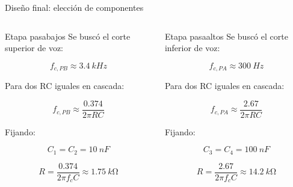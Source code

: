 \documentclass[aspectratio=169,11pt]{beamer}
\begin{document}
\begin{frame}{Diseño final: elección de componentes}
\scriptsize

\begin{columns}[c,onlytextwidth]

\begin{block}{Etapa pasabajos}
Se buscó el corte superior de voz:

\[
f_{c,PB}\approx \SI{3.4}{kHz}
\]

Para dos RC iguales en cascada:

\[
f_{c,PB}\approx \frac{0.374}{2\pi RC}
\]

Fijando:

\[
C_1=C_2=\SI{10}{nF}
\]

\[
R=\frac{0.374}{2\pi f_c C}
\approx \SI{1.75}{k\ohm}
\]



\end{block}

\begin{block}{Etapa pasaaltos}
Se buscó el corte inferior de voz:

\[
f_{c,PA}\approx \SI{300}{Hz}
\]

Para dos RC iguales en cascada:

\[
f_{c,PA}\approx \frac{2.67}{2\pi RC}
\]

Fijando:

\[
C_3=C_4=\SI{100}{nF}
\]

\[
R=\frac{2.67}{2\pi f_c C}
\approx \SI{14.2}{k\ohm}
\]

\end{block}

\end{columns}

\end{frame}
\end{document}
